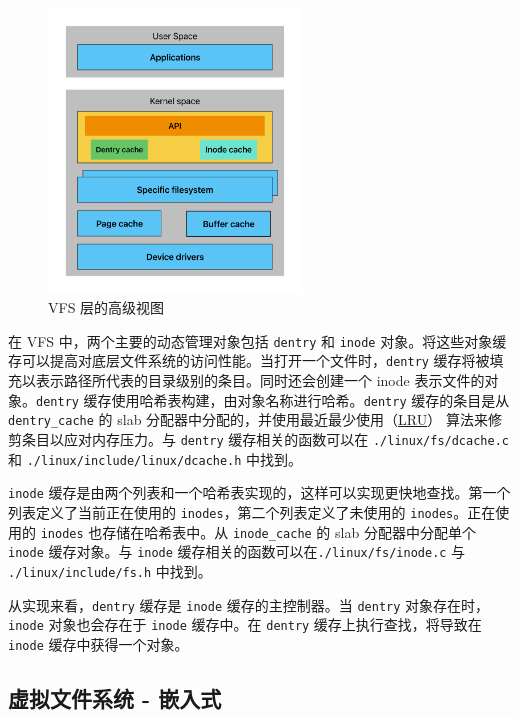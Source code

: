 \documentclass[UTF8,a4paper]{ctexart}
\begin{document}
\begin{figure}[H]
    \centering
    \includegraphics[width=0.6\textwidth]{High-level view of the VFS layer.png}
    \caption{VFS 层的高级视图}
\end{figure}

在 VFS 中，两个主要的动态管理对象包括 \texttt{dentry} 和 \texttt{inode}
对象。将这些对象缓存可以提高对底层文件系统的访问性能。当打开一个文件时，\texttt{dentry}
缓存将被填充以表示路径所代表的目录级别的条目。同时还会创建一个 inode
表示文件的对象。\texttt{dentry}
缓存使用哈希表构建，由对象名称进行哈希。\texttt{dentry} 缓存的条目是从
\texttt{dentry\_cache} 的 slab
分配器中分配的，并使用最近最少使用（\href{https://en.wikipedia.org/wiki/Cache_replacement_policies\#LRU}{LRU}）
算法来修剪条目以应对内存压力。与
\texttt{dentry} 缓存相关的函数可以在 \texttt{./linux/fs/dcache.c}和
\texttt{./linux/include/linux/dcache.h} 中找到。

\texttt{inode}
缓存是由两个列表和一个哈希表实现的，这样可以实现更快地查找。第一个列表定义了当前正在使用的
\texttt{inodes}，第二个列表定义了未使用的 \texttt{inodes}。正在使用的
\texttt{inodes} 也存储在哈希表中。从 \texttt{inode\_cache} 的 slab
分配器中分配单个 \texttt{inode} 缓存对象。与 \texttt{inode}
缓存相关的函数可以在\texttt{./linux/fs/inode.c} 与
\texttt{./linux/include/fs.h} 中找到。

从实现来看，\texttt{dentry} 缓存是 \texttt{inode} 缓存的主控制器。当
\texttt{dentry} 对象存在时，\texttt{inode} 对象也会存在于 \texttt{inode}
缓存中。在 \texttt{dentry} 缓存上执行查找，将导致在 \texttt{inode}
缓存中获得一个对象。

\subsection{虚拟文件系统 - 嵌入式}
\end{document}
